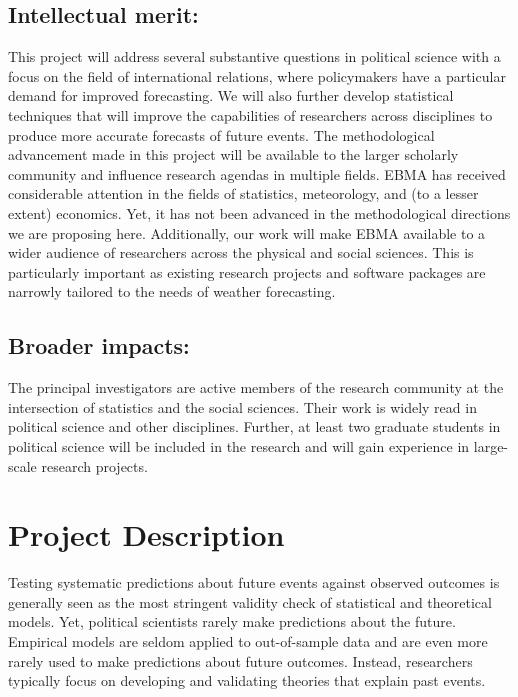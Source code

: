 \documentclass[pdftex,12pt,fullpage,oneside]{amsart}
\begin{document}

\subsection*{Intellectual merit:} 
This project will address several substantive questions in political
science with a focus on the field of international relations, where
policymakers have a particular demand for improved forecasting.  We
will also further develop statistical techniques that will improve the
capabilities of researchers across disciplines to produce more
accurate forecasts of future events. The methodological advancement
made in this project will be available to the larger scholarly
community and influence research agendas in multiple fields.  EBMA has
received considerable attention in the fields of statistics,
meteorology, and (to a lesser extent) economics.  Yet, it has not been
advanced in the methodological directions we are proposing here.
Additionally, our work will make EBMA available to a wider
audience of researchers across the physical and social sciences.  This
is particularly important as existing research projects and software
packages are narrowly tailored to the needs of weather forecasting.

\subsection*{Broader impacts:}
The principal investigators are active members of the research
community at the intersection of statistics and the social
sciences. Their work is widely read in political science and other
disciplines. Further, at least two graduate students in political
science will be included in the research and will gain experience in
large-scale research projects. 



 \newpage \setcounter{page}{1}

\section*{Project Description}

Testing systematic predictions about future events against observed
outcomes is generally seen as the most stringent validity check of
statistical and theoretical models.  Yet, political scientists rarely
make predictions about the future.  Empirical models are seldom
applied to out-of-sample data and are even more rarely used to make
predictions about future outcomes. Instead, researchers typically
focus on developing and validating theories that explain past events.
\end{document}

